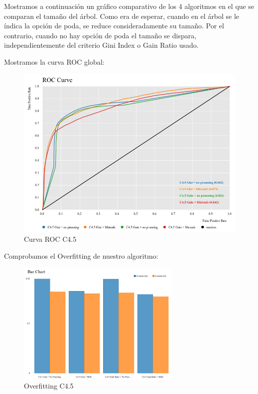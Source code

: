 Mostramos a continuación un gráfico comparativo de los 4 algoritmos en el que se comparan el tamaño del árbol. Como era de esperar, cuando en el árbol se le índica la opción de poda, se reduce consideradamente su tamaño. Por el contrario, cuando no hay opción de poda el tamaño se dispara, independientemente del criterio Gini Index o Gain Ratio usado.

	\newpage 
	Mostramos la curva ROC global:



	\begin{figure}[H]
		\centering
		\includegraphics[width=1\textwidth]{img/roc45.png}
		\caption{Curva ROC C4.5}
	\end{figure}


	
	Comprobamos el Overfitting de nuestro algoritmo:
	
	\begin{figure}[H]
		\centering
		\includegraphics[width=0.7\textwidth]{img/sobrec45.png}
		\caption{Overfitting C4.5}
	\end{figure}

